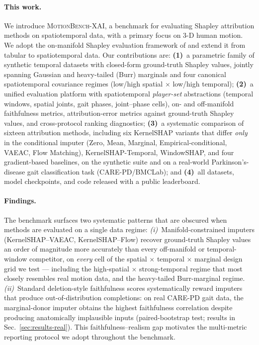 \paragraph{This work.}
We introduce \textsc{MotionBench-XAI}, a benchmark for evaluating Shapley
attribution methods on spatiotemporal data, with a primary focus on 3-D
human motion.  We adopt the on-manifold Shapley evaluation framework of
\citet{olsen2022using} and extend it from tabular to spatiotemporal data.
Our contributions are:
\textbf{(1)}~a parametric family of synthetic temporal datasets with
closed-form ground-truth Shapley values, jointly spanning Gaussian and
heavy-tailed (Burr) marginals and four canonical spatiotemporal
covariance regimes (low/high spatial $\times$ low/high temporal);
\textbf{(2)}~a unified evaluation platform with spatiotemporal
\emph{player-set} abstractions (temporal windows, spatial joints, gait
phases, joint--phase cells), on- and off-manifold faithfulness metrics,
attribution-error metrics against ground-truth Shapley values, and
cross-protocol ranking diagnostics;
\textbf{(3)}~a systematic comparison of sixteen attribution methods,
including six KernelSHAP variants that differ \emph{only} in the
conditional imputer (Zero, Mean, Marginal, Empirical-conditional,
VAEAC, Flow Matching), KernelSHAP-Temporal, WindowSHAP, and four
gradient-based baselines, on the synthetic suite and on a real-world
Parkinson's-disease gait classification task (CARE-PD/BMCLab);
and \textbf{(4)}~all datasets, model checkpoints, and code released
with a public leaderboard.

\paragraph{Findings.}
The benchmark surfaces two systematic patterns that are obscured when
methods are evaluated on a single data regime:
\emph{(i)}~Manifold-constrained imputers (KernelSHAP--VAEAC, KernelSHAP--Flow)
recover ground-truth Shapley values an order of magnitude more accurately than
every off-manifold or temporal-window competitor, on \emph{every} cell of the
spatial $\times$ temporal $\times$ marginal design grid we test --- including
the high-spatial $\times$ strong-temporal regime that most closely resembles
real motion data, and the heavy-tailed Burr-marginal regime.
\emph{(ii)}~Standard deletion-style faithfulness scores systematically reward
imputers that produce out-of-distribution completions: on real CARE-PD gait
data, the marginal-donor imputer obtains the highest faithfulness correlation
despite producing anatomically implausible inputs (paired-bootstrap test;
results in Sec.~\ref{sec:results-real}).  This faithfulness--realism gap
motivates the multi-metric reporting protocol we adopt throughout the
benchmark.

